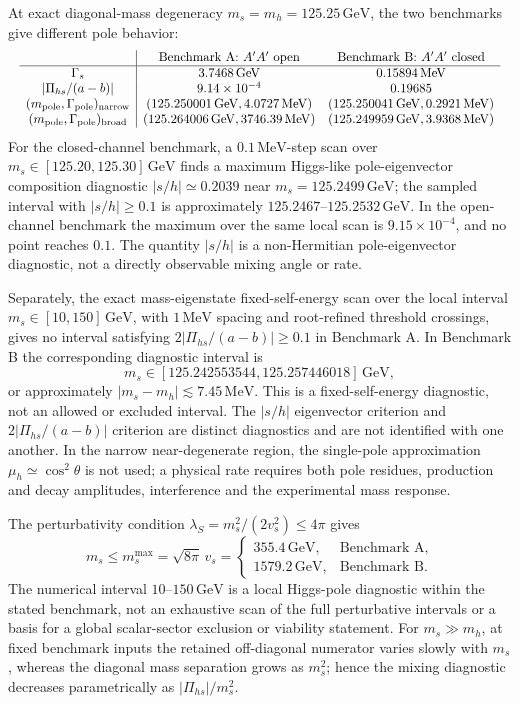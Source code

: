 \documentclass[12pt,a4paper]{article}
\begin{document}
At exact diagonal-mass degeneracy \(m_s=m_h=125.25\,\mathrm{GeV}\), the two benchmarks give different pole behavior:
\[
\resizebox{\textwidth}{!}{$
\begin{array}{c|cc}
&\text{Benchmark A: }A'A'\text{ open}
&\text{Benchmark B: }A'A'\text{ closed}\\ \hline
\Gamma_s&3.7468\,\mathrm{GeV}&0.15894\,\mathrm{MeV}\\
|\Pi_{hs}/(a-b)|&9.14\times10^{-4}&0.19685\\
(m_{\rm pole},\Gamma_{\rm pole})_{\rm narrow}&
(125.250001\,\mathrm{GeV},4.0727\,\mathrm{MeV})&
(125.250041\,\mathrm{GeV},0.2921\,\mathrm{MeV})\\
(m_{\rm pole},\Gamma_{\rm pole})_{\rm broad}&
(125.264006\,\mathrm{GeV},3746.39\,\mathrm{MeV})&
(125.249959\,\mathrm{GeV},3.9368\,\mathrm{MeV})
\end{array}
$}
\]
For the closed-channel benchmark, a \(0.1\,\mathrm{MeV}\)-step scan over \(m_s\in[125.20,125.30]\,\mathrm{GeV}\) finds a maximum Higgs-like pole-eigenvector composition diagnostic \(|s/h|\simeq0.2039\) near \(m_s=125.2499\,\mathrm{GeV}\); the sampled interval with \(|s/h|\geq0.1\) is approximately \(125.2467\)--\(125.2532\,\mathrm{GeV}\). In the open-channel benchmark the maximum over the same local scan is \(9.15\times10^{-4}\), and no point reaches \(0.1\). The quantity \(|s/h|\) is a non-Hermitian pole-eigenvector diagnostic, not a directly observable mixing angle or rate.

Separately, the exact mass-eigenstate fixed-self-energy scan over the local interval \(m_s\in[10,150]\,\mathrm{GeV}\), with \(1\,\mathrm{MeV}\) spacing and root-refined threshold crossings, gives no interval satisfying \(2|\Pi_{hs}/(a-b)|\geq0.1\) in Benchmark A. In Benchmark B the corresponding diagnostic interval is
\[
m_s\in[125.242553544,125.257446018]\,\mathrm{GeV},
\]
or approximately \(|m_s-m_h|\lesssim7.45\,\mathrm{MeV}\). This is a fixed-self-energy diagnostic, not an allowed or excluded interval. The \(|s/h|\) eigenvector criterion and \(2|\Pi_{hs}/(a-b)|\) criterion are distinct diagnostics and are not identified with one another. In the narrow near-degenerate region, the single-pole approximation \(\mu_h\simeq\cos^2\theta\) is not used; a physical rate requires both pole residues, production and decay amplitudes, interference and the experimental mass response.

The perturbativity condition \(\lambda_S=m_s^2/(2v_s^2)\leq4\pi\) gives
\[
m_s\leq m_s^{\max}=\sqrt{8\pi}\,v_s
=
\begin{cases}
355.4\,\mathrm{GeV},&\text{Benchmark A},\\
1579.2\,\mathrm{GeV},&\text{Benchmark B}.
\end{cases}
\]
The numerical interval \(10\)--\(150\,\mathrm{GeV}\) is a local Higgs-pole diagnostic within the stated benchmark, not an exhaustive scan of the full perturbative intervals or a basis for a global scalar-sector exclusion or viability statement. For \(m_s\gg m_h\), at fixed benchmark inputs the retained off-diagonal numerator varies slowly with \(m_s\), whereas the diagonal mass separation grows as \(m_s^2\); hence the mixing diagnostic decreases parametrically as \(|\Pi_{hs}|/m_s^2\).
\end{document}
